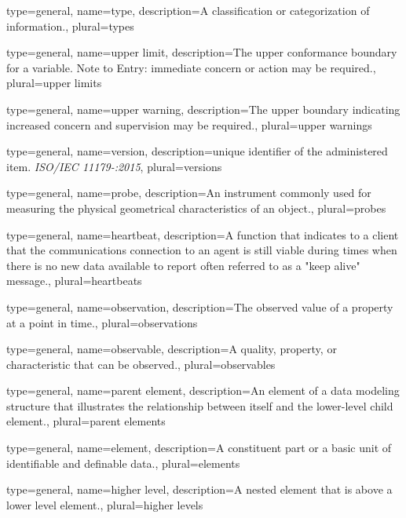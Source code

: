 {
	type={general},
    name={type},
	description={A classification or categorization of information.},
	plural={types}
}

{
	type={general},
    name={upper limit},
	description={The upper conformance boundary for a variable.
Note to Entry: immediate concern or action may be required.},
	plural={upper limits}
}

{
	type={general},
    name={upper warning},
	description={The upper boundary indicating increased concern and supervision may be required.},
	plural={upper warnings}
}

{
	type={general},
    name={version},
	description={unique identifier of the administered item. \textit{ISO/IEC 11179-:2015}},
	plural={versions}
}

{
	type={general},
    name={probe},
	description={An instrument commonly used for measuring the physical geometrical characteristics of an object.},
	plural={probes}
}

{
	type={general},
    name={heartbeat},
	description={A function that indicates to a \gls{client} that the communications connection to an \gls{agent} is still viable during times when there is no new data available to report  often referred to as a "keep alive" message.},
	plural={heartbeats}
}

{
	type={general},
    name={observation},
	description={The observed value of a property at a point in time.},
	plural={observations}
}

{
	type={general},
    name={observable},
	description={A quality, property, or characteristic that can be observed.},
	plural={observables}
}

{
	type={general},
    name={parent element},
	description={An \gls{element} of a data modeling structure that illustrates the relationship between itself and the lower-level \gls{child element}.},
	plural={parent elements}
}

{
	type={general},
    name={element},
	description={A constituent part or a basic unit of identifiable and definable data.},
	plural={elements}
}

{
	type={general},
    name={higher level},
	description={A nested element that is above a lower level element.},
	plural={higher levels}
}

